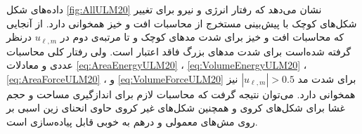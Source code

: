 داده‌های شکل 
\ref{fig:AllULM20}
نشان می‌دهد که رفتار انرژی و نیرو برای تغییر شکل‌های کوچک با پیش‌بینی مستخرج از محاسبات افت و خیز همخوانی دارد. از آنجایی که محاسبات افت و خیز برای شدت مد‌های کوچک و تا مرتبه‌ی دوم در 
$u_{\ell,m}$
درنظر گرفته شده‌است برای شدت‌ مد‌های بزرگ فاقد اعتبار است. ولی رفتار کلی محاسبات عددی و معادلات
\ref{eq:AreaEnergyULM20}
،
\ref{eq:VolumeEnergyULM20}
،
\ref{eq:AreaForceULM20}
، و
\ref{eq:VolumeForceULM20}
برای شد‌ت مد 
$|u_{\ell,m}|>0.5$
نیز همخوانی دارد. می‌توان نتیجه گرفت که محاسبات لازم برای اندازگیری مساحت و حجم غشا برای شکل‌های کروی و همچنین شکل‌های غیر کروی حاوی انحنای زین اسبی بر روی مش‌های معمولی  و  درهم به خوبی قابل پیاده‌سازی است.










